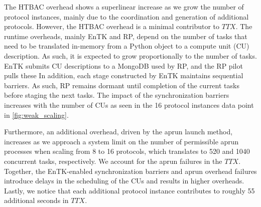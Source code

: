 The HTBAC overhead shows a superlinear increase as we grow the number of protocol
instances, mainly due to the coordination and generation of additional protocols.
However, the HTBAC overhead is a minimal contributor to \(TTX\).
The runtime overheads, mainly EnTK and RP, depend on the number of tasks that need to
be translated in-memory from a Python object to a compute unit (CU) description.
As such, it is expected to grow proportionally to the number of tasks. EnTK
submits CU descriptions to a MongoDB used by RP, and the RP pilot pulls these
In addition, each stage constructed by EnTK maintains sequential barriers. As
such, RP remains dormant until completion of the current tasks before staging
the next tasks. The impact of the synchronization barriers increases with the
number of CUs as seen in the 16 protocol instances data point in
\ref{fig:weak_scaling}.

Furthermore, an additional overhead, driven by the aprun launch method,
increases as we approach a system limit on the number of permissible aprun
processes when scaling from 8 to 16 protocols, which translates to 520 and
1040 concurrent tasks, respectively. We account for the aprun failures in the
\(TTX\). Together, the EnTK-enabled synchronization barriers and aprun
overhead failures introduce delays in the scheduling of the CUs and results in
higher overheads. Lastly, we notice that each additional protocol instance
contributes to roughly 55 additional seconds in \(TTX\).   








